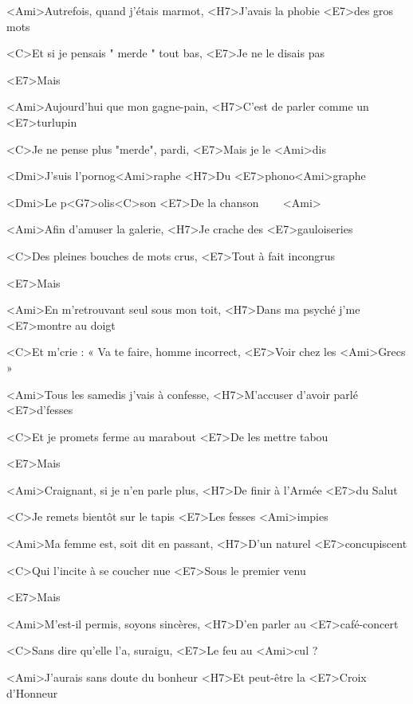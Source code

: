 

\zs
<Ami>Autrefois, quand j'étais marmot,
<H7>J'avais la phobie <E7>des gros mots

<C>Et si je pensais " merde " tout bas,
<E7>Je ne le disais pas

<E7>Mais

<Ami>Aujourd'hui que mon gagne-pain,
<H7>C'est de parler comme un <E7>turlupin

<C>Je ne pense plus "merde", pardi,
<E7>Mais je le <Ami>dis
\ks

\zr
<Dmi>J'suis l'pornog<Ami>raphe
<H7>Du <E7>phono<Ami>graphe

<Dmi>Le p<G7>olis<C>son
<E7>De la chanson ~~~ <Ami>
\kr

\zs
<Ami>Afin d'amuser la galerie,
<H7>Je crache des <E7>gauloiseries

<C>Des pleines bouches de mots crus,
<E7>Tout à fait incongrus

<E7>Mais

<Ami>En m'retrouvant seul sous mon toit,
<H7>Dans ma psyché j'me <E7>montre au doigt

<C>Et m'crie : « Va te faire, homme incorrect,
<E7>Voir chez les <Ami>Grecs »
\ks

\zr\kr

\zs
<Ami>Tous les samedis j'vais à confesse,
<H7>M'accuser d'avoir parlé <E7>d'fesses

<C>Et je promets ferme au marabout
<E7>De les mettre tabou

<E7>Mais

<Ami>Craignant, si je n'en parle plus,
<H7>De finir à l'Armée <E7>du Salut

<C>Je remets bientôt sur le tapis
<E7>Les fesses <Ami>impies
\ks

\zr\kr

\zs
<Ami>Ma femme est, soit dit en passant,
<H7>D'un naturel <E7>concupiscent

<C>Qui l'incite à se coucher nue
<E7>Sous le premier venu

<E7>Mais

<Ami>M'est-il permis, soyons sincères,
<H7>D'en parler au <E7>café-concert

<C>Sans dire qu'elle l'a, suraigu,
<E7>Le feu au <Ami>cul ?
\ks

\zr\kr

\zs
<Ami>J'aurais sans doute du bonheur
<H7>Et peut-être la <E7>Croix d'Honneur

